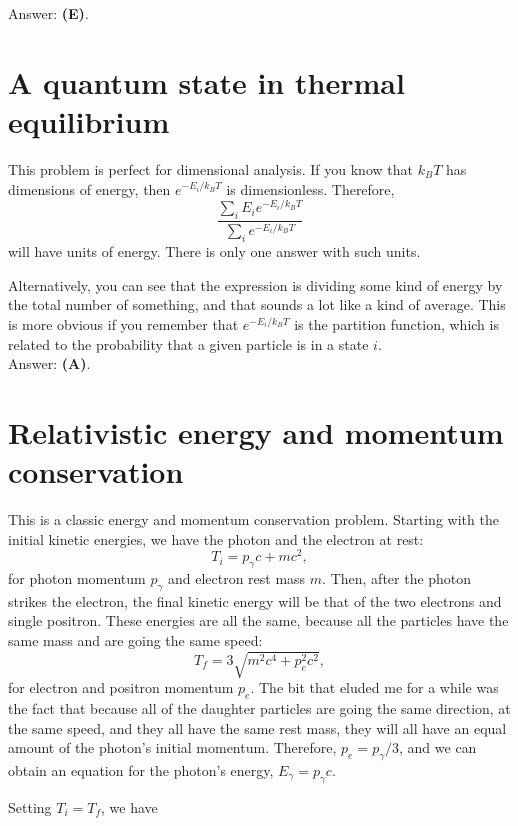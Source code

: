 \documentclass[11pt]{paper}
\newcommand{\answer}[1]{Answer: \textbf{(#1)}.}
\begin{document}
\answer{E}

\section{A quantum state in thermal equilibrium}
This problem is perfect for dimensional analysis.  If you know that $k_B T$ has dimensions of energy, then $e^{-E_i/k_B T}$ is dimensionless.  Therefore,
\begin{equation}
	\frac{\sum\limits_i E_i e^{-E_i/k_B T}}{\sum\limits_i e^{-E_i/k_B T}}
\end{equation}
will have units of energy.  There is only one answer with such units.

Alternatively, you can see that the expression is dividing some kind of energy by the total number of something, and that sounds a lot like a kind of average.  This is more obvious if you remember that $e^{-E_i/k_B T}$ is the partition function, which is related to the probability that a given particle is in a state $i$.\\

\answer{A}

\section{Relativistic energy and momentum conservation}
This is a classic energy and momentum conservation problem.  Starting with the initial kinetic energies, we have the photon and the electron at rest:
\begin{equation}
	T_i = p_\gamma c + mc^2,
\end{equation}
for photon momentum $p_\gamma$ and electron rest mass $m$.  Then, after the photon strikes the electron, the final kinetic energy will be that of the two electrons and single positron.  These energies are all the same, because all the particles have the same mass and are going the same speed:
\begin{equation}
	T_f = 3\sqrt{m^2c^4 + p_e^2c^2},
\end{equation}
for electron and positron momentum $p_e$.  The bit that eluded me for a while was the fact that because all of the daughter particles are going the same direction, at the same speed, and they all have the same rest mass, they will all have an equal amount of the photon's initial momentum.  Therefore, $p_e = p_\gamma/3$, and we can obtain an equation for the photon's energy, $E_\gamma = p_\gamma c$.

Setting $T_i = T_f$, we have
\end{document}
